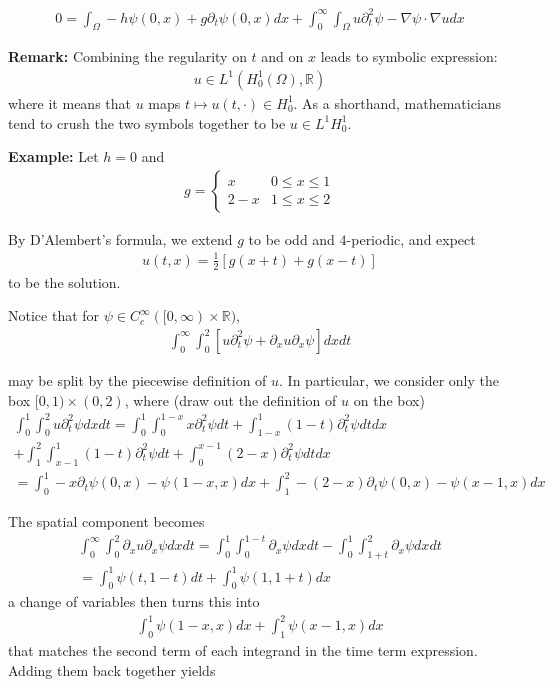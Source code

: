 \documentclass{article}
\newcommand{\R}{{\mathbb{R}}}
\newcommand{\pd}{\partial}
\newcommand{\CC}{C_{c}^{\infty}}
\begin{document}
	\begin{align*}
		0= \int_{\Omega} -h \psi(0,x) + g \pd_{t}\psi(0,x)dx + \int_{0}^{\infty} \int_{\Omega} u \pd_{t}^{2}\psi  - \nabla \psi \cdot \nabla u dx
	\end{align*}
	
	\textbf{Remark:} Combining the regularity on $t$ and on $x$ leads to symbolic expression: 
	\begin{align*}
		u \in L^{1}(H^{1}_{0}(\Omega),\R)
	\end{align*}
	where it means that $u$ maps $t \mapsto u(t,\cdot) \in H^{1}_{0}$. As a shorthand, mathematicians tend to crush the two symbols together to be $u \in L^{1}H^{1}_{0}$. 
	
	
	\vspace{0.25 cm}
	\textbf{Example:}
	Let $h = 0$ and 
	\begin{align*}
		g = \begin{cases}
			x & 0 \leq x \leq 1 \\ 2-x & 1 \leq x \leq 2
		\end{cases}
	\end{align*}
	
	By D'Alembert's formula, we extend $g$ to be odd and $4$-periodic, and expect 
	\begin{align*}
		u(t,x) = \frac{1}{2} [ g(x+t)+g(x-t)]
	\end{align*}
	to be the solution. 
	
	Notice that for $\psi \in \CC([0,\infty) \times \R)$, 
	\begin{align*}
		\int_{0}^{\infty} \int_{0}^{2} \left[u \pd_{t}^{2} \psi + \pd_{x}u \pd_{x}\psi \right]dxdt
	\end{align*}
	
	may be split by the piecewise definition of $u$. In particular, we consider only the box $[0,1) \times (0,2)$, where (draw out the definition of $u$ on the box)
	\begin{align*}
		\int_{0}^{1} \int_{0}^{2} u \pd_{t}^{2} \psi dxdt = \int_{0}^{1} \int_{0}^{1-x} x \pd_{t}^{2} \psi dt + \int_{1-x}^{1} (1-t) \pd_{t}^{2} \psi dt dx \\
		+ \int_{1}^{2} \int_{x-1}^{1} (1-t)\pd_{t}^{2} \psi dt + \int_{0}^{x-1} (2-x)\pd_{t}^{2} \psi dt dx \\
		= \int_{0}^{1}  -x\pd_{t} \psi (0,x) - \psi (1-x,x)dx + \int_{1}^{2}-(2-x)\pd_{t} \psi(0,x) - \psi(x-1,x) dx
	\end{align*}
	
	The spatial component becomes
	\begin{align*}
		\int_{0}^{\infty} \int_{0}^{2} \pd_{x}u \pd_{x}\psi dxdt = \int_{0}^{1} \int_{0}^{1-t} \pd_{x}\psi dxdt - \int_{0}^{1} \int_{1+t}^{2} \pd_{x} \psi dxdt\\
		= \int_{0}^{1} \psi(t,1-t) dt + \int_{0}^{1} \psi(1,1+t)dx
	\end{align*}
	a change of variables then turns this into 
	\begin{align*}
		\int_{0}^{1} \psi(1-x,x) dx + \int_{1}^{2} \psi(x-1,x)dx
	\end{align*}
	that matches the second term of each integrand in the time term expression. Adding them back together yields 
	
\end{document}
